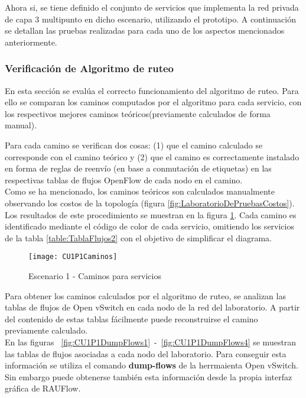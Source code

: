 Ahora si, se tiene definido el conjunto de servicios que implementa la red privada de capa 3 multipunto en dicho escenario, utilizando el prototipo. A continuaci\'on se detallan las pruebas realizadas para cada uno de los aspectos mencionados anteriormente.

\subsubsection{Verificaci\'on de Algoritmo de ruteo}
En esta secci\'on se eval\'ua el correcto funcionamiento del algoritmo de ruteo. Para ello se comparan los caminos computados por el algoritmo para cada servicio, con los respectivos mejores caminos te\'oricos(previamente calculados de forma manual). 

Para cada camino se verifican dos cosas: (1) que el camino calculado se corresponde con el camino te\'orico y (2) que el camino es correctamente instalado en forma de reglas de reenvío (en base a conmutaci\'on de etiquetas) en las respectivas tablas de flujos OpenFlow de cada nodo en el camino.\\

Como se ha mencionado, los caminos te\'oricos son calculados manualmente observando los costos de la topolog\'ia (figura \ref{fig:LaboratorioDePruebasCostos}). Los resultados de este procedimiento se muestran en la figura \ref{fig:CUP1Caminos}. Cada camino es identificado mediante el código de color de cada servicio, omitiendo los servicios de la tabla \ref{table:TablaFlujos2} con el objetivo de simplificar el diagrama.\\

\begin{figure}[ht!] 
\centering    
\texttt{[image: CU1P1Caminos]}
\caption[Escenario 1 - Caminos para servicios]{Escenario 1 - Caminos para servicios}
\label{fig:CUP1Caminos}
\end{figure}

Para obtener los caminos calculados por el algoritmo de ruteo, se analizan las tablas de flujos de Open vSwitch en cada nodo de la red del laboratorio. A partir del contenido de estas tablas fácilmente puede reconstruirse el camino previamente calculado.\\

En las figuras ~\ref{fig:CU1P1DumpFlows1}~-~\ref{fig:CU1P1DumpFlows4} se muestran las tablas de flujos asociadas a cada nodo del laboratorio. Para conseguir esta informaci\'on se utiliza el comando \textbf{dump-flows} de la herrmaienta Open vSwitch. Sin embargo puede obtenerse tambi\'en esta informaci\'on desde la propia interfaz gr\'afica de RAUFlow.\\


